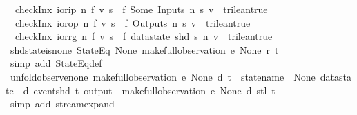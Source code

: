 \begin{isabellebody}
\ \ {\isachardoublequoteopen}checkInx\ ior{\isachardot}ip\ n\ f\ v\ s\ {\isacharequal}\ {\isacharparenleft}f\ {\isacharparenleft}Some\ {\isacharparenleft}Inputs\ {\isacharparenleft}n{\isacharminus}{}{\isacharparenright}\ s{\isacharparenright}{\isacharparenright}\ v\ {\isacharequal}\ trilean{\isachardot}true{\isacharparenright}{\isachardoublequoteclose}\ {\isacharbar}\isanewline
\ \ {\isachardoublequoteopen}checkInx\ ior{\isachardot}op\ n\ f\ v\ s\ {\isacharequal}\ {\isacharparenleft}f\ {\isacharparenleft}Outputs\ n\ s{\isacharparenright}\ v\ {\isacharequal}\ trilean{\isachardot}true{\isacharparenright}{\isachardoublequoteclose}\ {\isacharbar}\isanewline
\ \ {\isachardoublequoteopen}checkInx\ ior{\isachardot}rg\ n\ f\ v\ s\ {\isacharequal}\ {\isacharparenleft}f\ {\isacharparenleft}datastate\ {\isacharparenleft}shd\ s{\isacharparenright}\ n{\isacharparenright}\ v\ {\isacharequal}\ trilean{\isachardot}true{\isacharparenright}{\isachardoublequoteclose}\isanewline
\isanewline
{}\isamarkupfalse%
\ shd{\isacharunderscore}state{\isacharunderscore}is{\isacharunderscore}none{\isacharcolon}\ {\isachardoublequoteopen}{\isacharparenleft}StateEq\ None{\isacharparenright}\ {\isacharparenleft}make{\isacharunderscore}full{\isacharunderscore}observation\ e\ None\ r\ t{\isacharparenright}{\isachardoublequoteclose}\isanewline
%
\isadelimproof
\ \ %
\endisadelimproof
%
\isatagproof
{}\isamarkupfalse%
\ {\isacharparenleft}simp\ add{\isacharcolon}\ StateEq{\isacharunderscore}def{\isacharparenright}%
\endisatagproof
{\isafoldproof}%
%
\isadelimproof
\isanewline
%
\endisadelimproof
\isanewline
{}\isamarkupfalse%
\ unfold{\isacharunderscore}observe{\isacharunderscore}none{\isacharcolon}\ {\isachardoublequoteopen}make{\isacharunderscore}full{\isacharunderscore}observation\ e\ None\ d\ t\ {\isacharequal}\ {\isacharparenleft}{\isasymlparr}statename\ {\isacharequal}\ None{\isacharcomma}\ datastate\ {\isacharequal}\ d{\isacharcomma}\ event{\isacharequal}{\isacharparenleft}shd\ t{\isacharparenright}{\isacharcomma}\ output\ {\isacharequal}\ {\isacharbrackleft}{\isacharbrackright}{\isasymrparr}{\isacharhash}{\isacharhash}{\isacharparenleft}make{\isacharunderscore}full{\isacharunderscore}observation\ e\ None\ d\ {\isacharparenleft}stl\ t{\isacharparenright}{\isacharparenright}{\isacharparenright}{\isachardoublequoteclose}\isanewline
%
\isadelimproof
\ \ %
\endisadelimproof
%
\isatagproof
{}\isamarkupfalse%
\ {\isacharparenleft}simp\ add{\isacharcolon}\ stream{\isachardot}expand{\isacharparenright}%
\endisatagproof
{\isafoldproof}%

\end{isabellebody}
